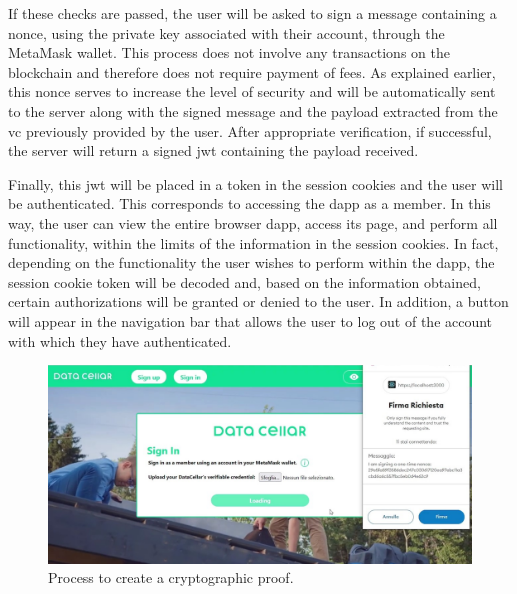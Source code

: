 

If these checks are passed, the user will be asked to sign a message containing a \gls{nonce}, using the private key associated with their account, through the MetaMask wallet. 
This process does not involve any transactions on the blockchain and therefore does not require payment of fees. As explained earlier, this \gls{nonce} serves to increase the 
level of security and will be automatically sent to the server along with the signed message and the payload extracted from the \gls{vc} previously provided by the user. After 
appropriate verification, if successful, the server will return a signed \gls{jwt} containing the payload received.

Finally, this \gls{jwt} will be placed in a token in the session cookies and the user will be authenticated. This corresponds to accessing the \gls{dapp} as a member. In this 
way, the user can view the entire browser \gls{dapp}, access its page, and perform all functionality, within the limits of the information in the session cookies. In fact, 
depending on the functionality the user wishes to perform within the \gls{dapp}, the session cookie token will be decoded and, based on the information obtained, certain 
authorizations will be granted or denied to the user. In addition, a button will appear in the navigation bar that allows the user to log out of the account with which they have authenticated.

\begin{figure}[h]  
  \centering
  \includegraphics[width=1\textwidth]{Images/c6_3.jpg} 
  \caption{Process to create a cryptographic proof.}
\end{figure}


